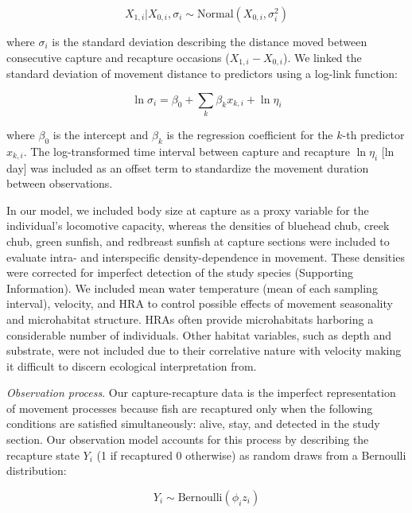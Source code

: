 \documentclass[11pt, class=article, crop=false]{standalone}
\begin{document}
\begin{equation}
    X_{1, i}|X_{0, i}, \sigma_i \sim \text{Normal}(X_{0, i}, \sigma_i^2)
    \label{eq:normal}
\end{equation}

where $\sigma_i$ is the standard deviation describing the distance moved between consecutive capture and recapture occasions ($X_{1,i} - X_{0,i}$).
We linked the standard deviation of  movement distance to predictors using a log-link function: 

\begin{equation}
    \ln \sigma_i = \beta_0 + \sum_{k} \beta_k x_{k,i} + \ln \eta_i
    \label{eq:linear-pred}
\end{equation}

where $\beta_0$ is the intercept and $\beta_k$ is the regression coefficient for the $k$-th predictor $x_{k,i}$. The log-transformed time interval between capture and recapture $\ln \eta_i$ [ln day] was included as an offset term to standardize the movement duration between observations.

In our model, we included body size at capture as a proxy variable for the individual’s locomotive capacity, whereas the densities of bluehead chub, creek chub, green sunfish, and redbreast sunfish at capture sections were included to evaluate intra- and interspecific density-dependence in movement. These densities were corrected for imperfect detection of the study species (Supporting Information). We included mean water temperature (mean of each sampling interval), velocity, and HRA to control possible effects of movement seasonality and microhabitat structure. HRAs often provide microhabitats harboring a considerable number of individuals.  Other habitat variables, such as depth and substrate, were not included due to their correlative nature with velocity making it difficult to discern ecological interpretation from. 

\textit{Observation process}. Our capture-recapture data is the imperfect representation of movement processes because fish are recaptured only when the following conditions are satisfied simultaneously: alive, stay, and detected in the study section. Our observation model accounts for this process by describing the recapture state $Y_i$ (1 if recaptured 0 otherwise) as random draws from a Bernoulli distribution:

\begin{equation}
    Y_i \sim \text{Bernoulli}(\phi_i z_i)
\end{equation}
\end{document}
